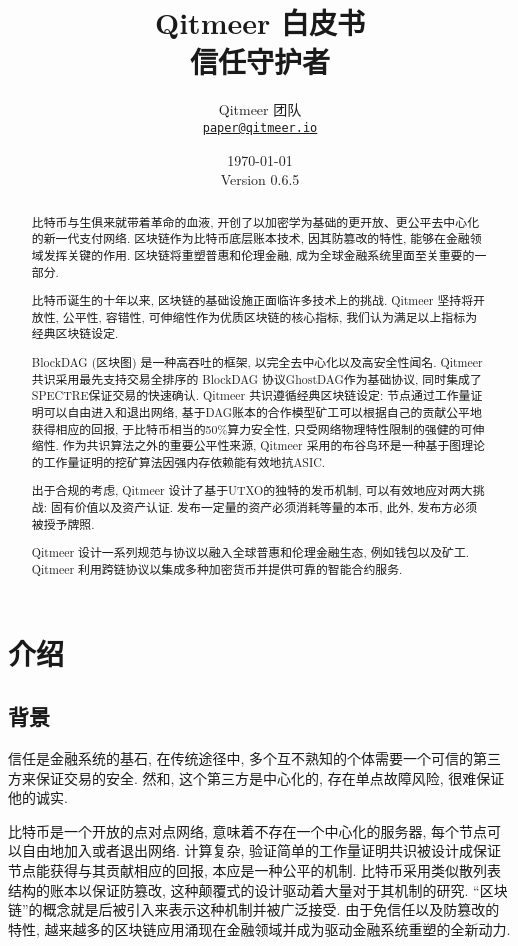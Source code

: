 \documentclass[a4paper,11pt]{article}
\title{\LARGE Qitmeer 白皮书\\
	\Large 信任守护者}
\author{
	Qitmeer 团队\\
		\small\href{mailto:paper@qitmeer.io}
			{\nolinkurl{paper@qitmeer.io}}
	}
\date{\today\\\small Version 0.6.5}
\newcommand{\watermark}[3]{\AddToShipoutPictureBG{
	\parbox[b][\paperheight]{\paperwidth}{
		\vfill%
		\centering%
	\tikz[remember picture, overlay]%
	  \node [rotate = #1, scale = #2] at (current page.center)%
	      {\textcolor{gray!80!cyan!30}{#3}};
	  \vfill}}}
\begin{document}
\clearpage
\pagestyle{plain}

\maketitle


\begin{abstract}
比特币\cite{bitcoin}与生俱来就带着革命的血液, 开创了以加密学为基础的更开放、更公平去中心化的新一代支付网络. 区块链作为比特币底层账本技术, 因其防篡改的特性, 能够在金融领域发挥关键的作用. 区块链将重塑普惠和伦理金融, 成为全球金融系统里面至关重要的一部分.

比特币诞生的十年以来, 区块链的基础设施正面临许多技术上的挑战. Qitmeer 坚持将开放性, 公平性, 容错性, 可伸缩性作为优质区块链的核心指标, 我们认为满足以上指标为经典区块链设定.

BlockDAG (区块图) 是一种高吞吐的框架, 以完全去中心化以及高安全性闻名. Qitmeer共识采用最先支持交易全排序的 BlockDAG 协议GhostDAG作为基础协议, 同时集成了SPECTRE保证交易的快速确认. Qitmeer 共识遵循经典区块链设定: 节点通过工作量证明可以自由进入和退出网络, 基于DAG账本的合作模型矿工可以根据自己的贡献公平地获得相应的回报, 于比特币相当的50\%算力安全性, 只受网络物理特性限制的强健的可伸缩性. 作为共识算法之外的重要公平性来源, Qitmeer 采用的布谷鸟环是一种基于图理论的工作量证明的挖矿算法因强内存依赖能有效地抗ASIC. 

出于合规的考虑, Qitmeer 设计了基于UTXO的独特的发币机制, 可以有效地应对两大挑战: 固有价值以及资产认证. 发布一定量的资产必须消耗等量的本币, 此外, 发布方必须被授予牌照.

Qitmeer 设计一系列规范与协议以融入全球普惠和伦理金融生态, 例如钱包以及矿工. Qitmeer 利用跨链协议以集成多种加密货币并提供可靠的智能合约服务.

\end{abstract}

\section{介绍}

\subsection{背景}

信任是金融系统的基石, 在传统途径中, 多个互不熟知的个体需要一个可信的第三方来保证交易的安全. 然和, 这个第三方是中心化的, 存在单点故障风险, 很难保证他的诚实.


比特币是一个开放的点对点网络, 意味着不存在一个中心化的服务器, 每个节点可以自由地加入或者退出网络. 计算复杂, 验证简单的工作量证明共识被设计成保证节点能获得与其贡献相应的回报, 本应是一种公平的机制. 比特币采用类似散列表结构的账本以保证防篡改, 这种颠覆式的设计驱动着大量对于其机制的研究. “区块链”的概念就是后被引入来表示这种机制并被广泛接受. 由于免信任以及防篡改的特性, 越来越多的区块链应用涌现在金融领域并成为驱动金融系统重塑的全新动力.
\end{document}
